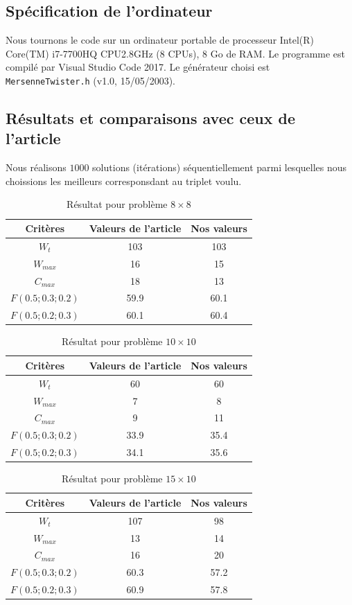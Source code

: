 \documentclass[10pt,a4paper]{scrartcl}
\begin{document}
\subsection{Spécification de l'ordinateur}
Nous tournons le code sur un ordinateur portable de processeur Intel(R) Core(TM) i7-7700HQ CPU\@2.8GHz (8 CPUs), 8 Go de RAM. Le programme est compilé par Visual Studio Code 2017. Le générateur choisi est \texttt{MersenneTwister.h} (v1.0, 15/05/2003).

\subsection{Résultats et comparaisons avec ceux de l'article}
Nous réalisons $1000$ solutions (itérations) séquentiellement parmi lesquelles nous choissions les meilleurs corresponsdant au triplet voulu.
\begin{table}[!h]
  \centering
  \begin{tabular}{|c|c|c|}
    \hline
    Critères & Valeurs de l'article & Nos valeurs \\
    \hline
    $W_t$ & 103 & 103 \\
    $W_{max}$ & 16 & 15 \\
    $C_{max}$ & 18 & 13 \\
    $F(0.5;0.3;0.2)$ & 59.9 & 60.1 \\
    $F(0.5;0.2;0.3)$ & 60.1 & 60.4 \\
    \hline
  \end{tabular}
  \caption{Résultat pour problème $8 \times 8$}
\end{table}

\begin{table}[!h]
  \centering
  \begin{tabular}{|c|c|c|}
    \hline
    Critères & Valeurs de l'article & Nos valeurs \\
    \hline
    $W_t$ & 60 & 60 \\
    $W_{max}$ & 7 & 8 \\
    $C_{max}$ & 9 & 11 \\
    $F(0.5;0.3;0.2)$ & 33.9 & 35.4 \\
    $F(0.5;0.2;0.3)$ & 34.1 & 35.6 \\
    \hline
  \end{tabular}
  \caption{Résultat pour problème $10 \times 10$}
\end{table}

\begin{table}[!h]
  \centering
  \begin{tabular}{|c|c|c|}
    \hline
    Critères & Valeurs de l'article & Nos valeurs \\
    \hline
    $W_t$ & 107 & 98 \\
    $W_{max}$ & 13 & 14 \\
    $C_{max}$ & 16 & 20 \\
    $F(0.5;0.3;0.2)$ & 60.3 & 57.2 \\
    $F(0.5;0.2;0.3)$ & 60.9 & 57.8 \\
    \hline
  \end{tabular}
  \caption{Résultat pour problème $15 \times 10$}
\end{table}
\end{document}
